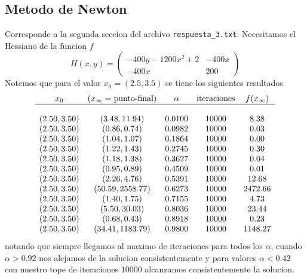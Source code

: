 \documentclass[letterpaper]{article}
\begin{document}
\subsection*{Metodo de Newton}
\noindent Corresponde a la segunda seccion del archivo
\texttt{respuesta\_3.txt}. Necesitamos el Hessiano de la funcion \(f\)
\[ H (x,y) =
  \begin{pmatrix}
    -400 y - 1200 x^2 + 2 & -400 x \\
    -400 x & 200
  \end{pmatrix}
\]
Notemos que para el valor \(x_0 = (2.5, 3.5)\) se tiene los siguientes resultados
\[
\begin{array}{c c c c c}
  x_0 & (x_{\infty} = \text{punto-final}) & \alpha & \text{iteraciones} &
    f(x_{\infty}) \\
  \hline \\
  (2.50, 3.50) & (3.48, 11.94)    & 0.0100 & 10000 & 8.38    \\
  (2.50, 3.50) & (0.86, 0.74)     & 0.0982 & 10000 & 0.03    \\
  (2.50, 3.50) & (1.04, 1.07)     & 0.1864 & 10000 & 0.00    \\
  (2.50, 3.50) & (1.22, 1.43)     & 0.2745 & 10000 & 0.30    \\
  (2.50, 3.50) & (1.18, 1.38)     & 0.3627 & 10000 & 0.04    \\
  (2.50, 3.50) & (0.95, 0.89)     & 0.4509 & 10000 & 0.01    \\
  (2.50, 3.50) & (2.26, 4.76)     & 0.5391 & 10000 & 12.68   \\
  (2.50, 3.50) & (50.59, 2558.77) & 0.6273 & 10000 & 2472.66 \\
  (2.50, 3.50) & (1.40, 1.75)     & 0.7155 & 10000 & 4.73    \\
  (2.50, 3.50) & (5.50, 30.03)    & 0.8036 & 10000 & 23.44   \\
  (2.50, 3.50) & (0.68, 0.43)     & 0.8918 & 10000 & 0.23    \\
  (2.50, 3.50) & (34.41, 1183.79) & 0.9800 & 10000 & 1148.27 \\
\end{array}
\]
notando que siempre llegamos al maximo de iteraciones para todos los
\(\alpha\), cuando \(\alpha > 0.92\) nos alejamos de la solucion
consistentemente y para valores \(\alpha < 0.42\) con nuestro tope de
iteraciones \(10000\) alcanzamos consistentemente la solucion.
\end{document}
